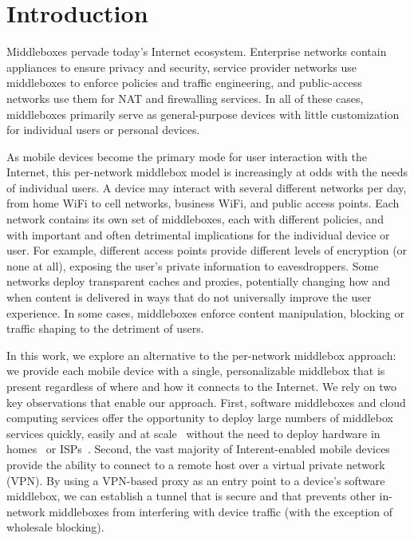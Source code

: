 \section{Introduction}
\label{sec:introduction}


Middleboxes pervade today's Internet ecosystem. Enterprise networks contain appliances to 
ensure privacy and security, service provider networks use middleboxes to enforce policies 
and traffic engineering, and public-access networks use them for NAT and firewalling services. In all 
of these cases, middleboxes primarily serve as general-purpose devices with little customization 
for individual users or personal devices. 

As mobile devices become the primary mode for user interaction with the Internet, this 
per-network middlebox model is increasingly at odds with the needs of individual users. 
A device may interact with several different 
networks per day, from home WiFi to cell networks, business WiFi, and public access points. 
Each network contains its own set of middleboxes, each with different policies, and with important 
and often detrimental implications for the individual device or user. 
For example, different access points provide different levels of encryption (or none at all), 
exposing the user's private information to eavesdroppers. Some networks deploy transparent 
caches and proxies, potentially changing how and when content is delivered in ways that 
do not universally improve the user experience. In some cases, middleboxes enforce 
content manipulation, blocking or traffic shaping to the detriment of users.

In this work, we explore an alternative to the per-network middlebox approach: we provide each 
mobile device with a single, personalizable middlebox that is present regardless of where and 
how it connects to the Internet. We rely on two key observations that enable our approach. First, 
software middleboxes and cloud computing services offer the opportunity to deploy large numbers 
of middlebox services quickly, easily and at scale~\cite{sherry:middleboxes} without 
the need to deploy hardware in homes~\cite{bismarck} or ISPs~\cite{morleysmiddleboxpaper}. Second, 
the vast majority of Interent-enabled mobile devices provide the ability to connect to a remote host over a virtual private 
network (VPN). By using a VPN-based proxy as an entry point to a device's software middlebox, we can 
establish a tunnel that is secure and that prevents other in-network middleboxes from interfering with 
device traffic (with the exception of wholesale blocking). 

